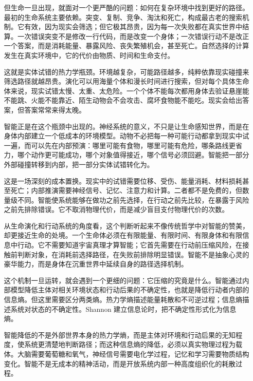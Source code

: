 
但生命一旦出现，就面对一个更严酷的问题：如何在复杂环境中找到更好的路径。最初的生命系统主要依赖。突变、复制、竞争、淘汰和死亡，构成最古老的搜索机制。它有效，因为现实会筛选；但它极其昂贵，因为每一次失败都在真实世界中结算。一次错误突变不是修改一行代码，而是改变一个身体；一次错误行动不是改正一个答案，而是消耗能量、暴露风险、丧失繁殖机会，甚至死亡。自然选择的计算发生在真实环境中，它的代价由物质、时间和生命支付。

这就是实体试错的热力学瓶颈。环境越复杂，可能路径越多，纯粹依靠现实碰撞来筛选路径就越昂贵。演化可以用海量个体和漫长时间进行搜索，但对每个具体生命体来说，现实试错太慢、太重、太危险。一个个体不能每次都用身体去验证悬崖能不能跳、火能不能靠近、陌生动物会不会攻击、腐坏食物能不能吃。现实会给出答案，但答案常常来得太晚。

智能正是在这个瓶颈中出现的。神经系统的意义，不只是让生命感知世界，而是在身体内部建立一个低成本的环境模型。动物不必把每一种可能行动都拿到现实中试一遍，而可以先在内部预演：哪里可能有食物，哪里可能有危险，哪条路线更省力，哪个动作更可能成功，哪个对象值得接近，哪个信号必须回避。智能把一部分外部碰撞转移到内部，把一部分实体试错转化为。

这是一场深刻的成本置换。现实中的试错需要位移、受伤、能量消耗、材料损耗甚至死亡；内部推演需要神经信号、记忆、注意力和计算。二者都不是免费的，但数量级不同。智能使系统能够在做功之前先选择，在行动之前先比较，在暴露于风险之前先排除错误。它不取消物理代价，而是减少盲目支付物理代价的次数。

从生命演化和行动系统的角度看，这个判断听起来不像传统哲学中对智能的赞美，却更接近生命的处境。一个生命体必须在有限能量、有限时间、有限身体和有限信息中行动。它不需要知道宇宙真理才算智能；它首先需要在行动前压缩风险，在接触前判断对象，在消耗前选择路径，在失败前排除明显错误。智能不是抽象心灵的豪华能力，而是身体在沉重世界中延续自身的路径选择机制。


这个机制一旦运转，就会遇到一个更细的问题：它压缩的究竟是什么。智能通过内部模型降低主体对相关环境状态和行动后果的不确定性，也就是降低行动者内部的信息熵。但这里需要区分两类熵。热力学熵描述能量耗散和不可逆过程；信息熵描述系统对状态的不确定性。Shannon 建立信息论时，把不确定性形式化为信息熵。\cite{shannon1948}

智能降低的不是外部世界本身的热力学熵，而是主体对环境和行动后果的无知程度，使系统更清楚地判断路径；而这种信息熵的降低，必须以真实物理过程为载体。大脑需要葡萄糖和氧气，神经信号需要电化学过程，记忆和学习需要物质结构变化。智能不是无成本的精神活动，而是开放系统内部一种高度组织化的耗散过程。

